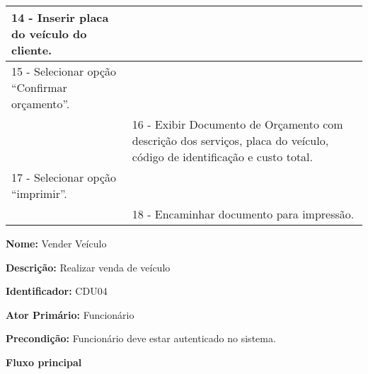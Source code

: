 \begin{tabular}{|p{7cm}|p{7cm}|}
	
	14 - Inserir placa do veículo do cliente. 
	&  \\ 
	\hline 
	
	
	15 - Selecionar opção “Confirmar orçamento”.
	&  \\ 
	\hline 
	& 
	
	16 - Exibir Documento de Orçamento com descrição dos serviços, placa do veículo, código de identificação e  custo total.
	\\ 
	\hline 
	
	
	17 - Selecionar opção “imprimir”.
	&  \\ 
	\hline 
	& 
	
	18 - Encaminhar documento para impressão.
	\\ 
	\hline 
\end{tabular} 
	

\par
\textbf{Nome:} Vender Veículo 
\par
\textbf{Descrição:} Realizar venda de veículo 
\par 
\textbf{Identificador:} CDU04
\par
\textbf{Ator Primário:} Funcionário	
\par
\textbf{Precondição:} Funcionário deve estar autenticado no sistema.
\par	
\par
\textbf{Fluxo principal}\par
